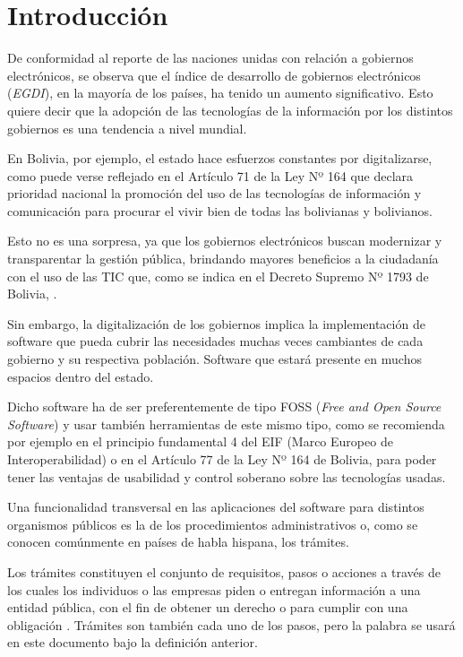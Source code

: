 \section{Introducción}

De conformidad al reporte de las naciones unidas con relación a gobiernos electrónicos, se observa que el índice de desarrollo de gobiernos electrónicos (\textit{EGDI}), en la mayoría de los países, ha tenido un aumento significativo. Esto quiere decir que la adopción de las tecnologías de la información por los distintos gobiernos es una tendencia a nivel mundial.

En Bolivia, por ejemplo, el estado hace esfuerzos constantes por digitalizarse, como puede verse reflejado en el Artículo 71 de la Ley Nº 164 que declara prioridad nacional la promoción del uso de las tecnologías de información y comunicación para procurar el vivir bien de todas las bolivianas y bolivianos.

Esto no es una sorpresa, ya que los gobiernos electrónicos buscan modernizar y transparentar la gestión pública, brindando mayores beneficios a la ciudadanía con el uso de las TIC que, como se indica en el Decreto Supremo Nº 1793 de Bolivia, .

Sin embargo, la digitalización de los gobiernos implica la implementación de software que pueda cubrir las necesidades muchas veces cambiantes de cada gobierno y su respectiva población. Software que estará presente en muchos espacios dentro del estado.

Dicho software ha de ser preferentemente de tipo FOSS (\textit{Free and Open Source Software}) y usar también herramientas de este mismo tipo, como se recomienda por ejemplo en el principio fundamental 4 del EIF (Marco Europeo de Interoperabilidad) o en el Artículo 77 de la Ley Nº 164 de Bolivia, para poder tener las ventajas de usabilidad y control soberano sobre las tecnologías usadas.

Una funcionalidad transversal en las aplicaciones del software para distintos organismos públicos es la de los procedimientos administrativos o, como se conocen comúnmente en países de habla hispana, los trámites.

Los trámites constituyen el conjunto de requisitos, pasos o acciones a través de los cuales los individuos o las empresas piden o entregan información a una entidad pública, con el fin de obtener un derecho o para cumplir con una obligación \cite{rosethFinTramiteEterno2018}. Trámites son también cada uno de los pasos, pero la palabra se usará en este documento bajo la definición anterior.

